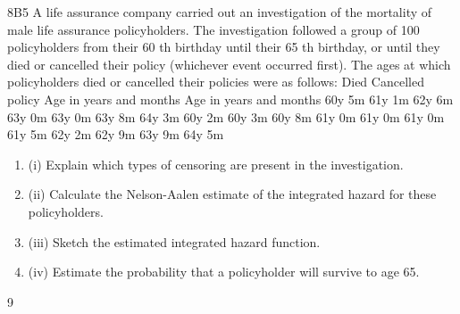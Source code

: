 \documentclass[a4paper,12pt]{article}
\begin{document}

 8B5
A life assurance company carried out an investigation of the mortality of male life
assurance policyholders. The investigation followed a group of 100 policyholders
from their 60 th birthday until their 65 th birthday, or until they died or cancelled their
policy (whichever event occurred first).
The ages at which policyholders died or cancelled their policies were as follows:
Died Cancelled policy
Age in
years and months Age in
years and months
60y 5m
61y 1m
62y 6m
63y 0m
63y 0m
63y 8m
64y 3m 60y 2m
60y 3m
60y 8m
61y 0m
61y 0m
61y 0m
61y 5m
62y 2m
62y 9m
63y 9m
64y 5m
\begin{enumerate}
\item (i) Explain which types of censoring are present in the investigation. 
\item (ii) Calculate the Nelson-Aalen estimate of the integrated hazard for these
policyholders. 
\item (iii) Sketch the estimated integrated hazard function. 
\item (iv) Estimate the probability that a policyholder will survive to age 65.
\end{enumerate}

 9



\n
\end{document}
